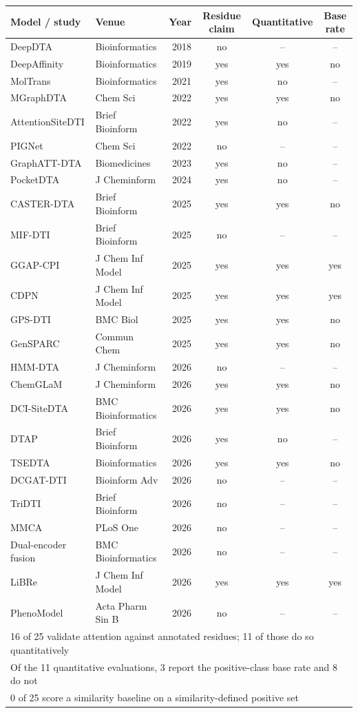 \begin{tabular}{llrccc}
\toprule
Model / study & Venue & Year & Residue claim & Quantitative & Base rate \\
\midrule
DeepDTA & Bioinformatics & 2018 & no & -- & -- \\
DeepAffinity & Bioinformatics & 2019 & yes & yes & no \\
MolTrans & Bioinformatics & 2021 & yes & no & -- \\
MGraphDTA & Chem Sci & 2022 & yes & yes & no \\
AttentionSiteDTI & Brief Bioinform & 2022 & yes & no & -- \\
PIGNet & Chem Sci & 2022 & no & -- & -- \\
GraphATT-DTA & Biomedicines & 2023 & yes & no & -- \\
PocketDTA & J Cheminform & 2024 & yes & no & -- \\
CASTER-DTA & Brief Bioinform & 2025 & yes & yes & no \\
MIF-DTI & Brief Bioinform & 2025 & no & -- & -- \\
GGAP-CPI & J Chem Inf Model & 2025 & yes & yes & yes \\
CDPN & J Chem Inf Model & 2025 & yes & yes & yes \\
GPS-DTI & BMC Biol & 2025 & yes & yes & no \\
GenSPARC & Commun Chem & 2025 & yes & yes & no \\
HMM-DTA & J Cheminform & 2026 & no & -- & -- \\
ChemGLaM & J Cheminform & 2026 & yes & yes & no \\
DCI-SiteDTA & BMC Bioinformatics & 2026 & yes & yes & no \\
DTAP & Brief Bioinform & 2026 & yes & no & -- \\
TSEDTA & Bioinformatics & 2026 & yes & yes & no \\
DCGAT-DTI & Bioinform Adv & 2026 & no & -- & -- \\
TriDTI & Brief Bioinform & 2026 & no & -- & -- \\
MMCA & PLoS One & 2026 & no & -- & -- \\
Dual-encoder fusion & BMC Bioinformatics & 2026 & no & -- & -- \\
LiBRe & J Chem Inf Model & 2026 & yes & yes & yes \\
PhenoModel & Acta Pharm Sin B & 2026 & no & -- & -- \\
\midrule
\multicolumn{6}{l}{16 of 25 validate attention against annotated residues; 11 of those do so quantitatively} \\
\multicolumn{6}{l}{Of the 11 quantitative evaluations, 3 report the positive-class base rate and 8 do not} \\
\multicolumn{6}{l}{0 of 25 score a similarity baseline on a similarity-defined positive set} \\
\bottomrule
\end{tabular}
